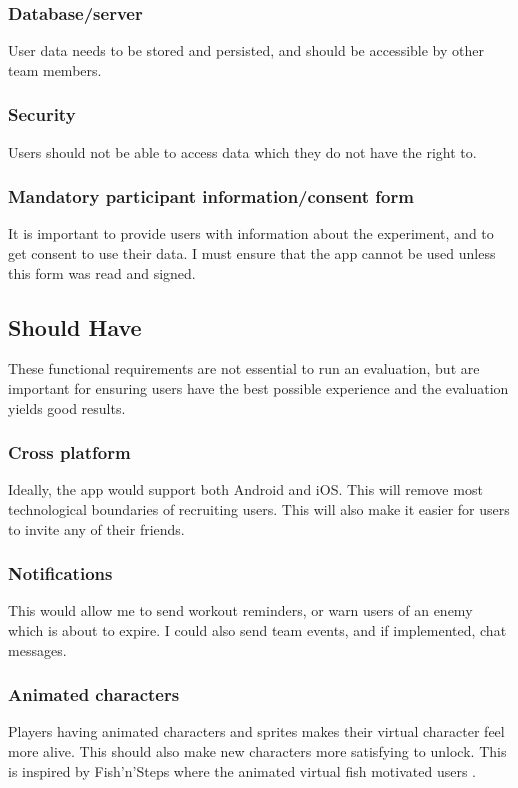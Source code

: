 \documentclass{l4proj}
\begin{document}
  \subsubsection{Database/server} User data needs to be stored and persisted, and should be accessible by other team members. 

  \subsubsection{Security} Users should not be able to access data which they do not have the right to. 

  \subsubsection{Mandatory participant information/consent form }
  It is important to provide users with information about the experiment, and to get consent to use their data. I must ensure that the app cannot be used unless this form was read and signed.

\subsection{Should Have}
  These functional requirements are not essential to run an evaluation, but are important for ensuring users have the best possible experience and the evaluation yields good results.

  \subsubsection{Cross platform} 
  Ideally, the app would support both Android and iOS. This will remove most technological boundaries of recruiting users. This will also make it easier for users to invite any of their friends. 

  \subsubsection{Notifications} 
  This would allow me to send workout reminders, or warn users of an enemy which is about to expire. I could also send team events, and if implemented, chat messages.

  \subsubsection{Animated characters}
  Players having animated characters and sprites makes their virtual character feel more alive. This should also make new characters more satisfying to unlock. This is inspired by Fish'n'Steps where the animated virtual fish motivated users \citep{Fish'n'Steps}.
\end{document}
